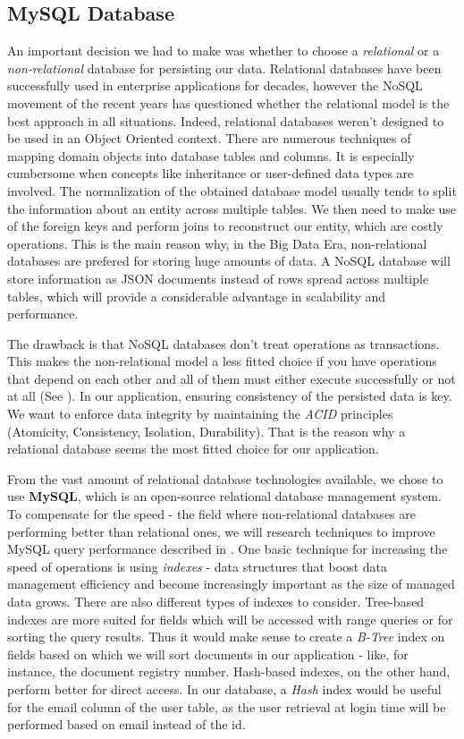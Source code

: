 \subsection{MySQL Database}
\label{section:mysqlDatabase}

An important decision we had to make was whether to choose a \textit{relational} or a \textit{non-relational} database for persisting our data. Relational databases have been successfully used in enterprise applications for decades, however the NoSQL movement of the recent years has questioned whether the relational model is the best approach in all situations. Indeed, relational databases weren't designed to be used in an Object Oriented context. There are numerous techniques of mapping domain objects into database tables and columns. It is especially cumbersome when concepts like inheritance or user-defined data types are involved. The normalization of the obtained database model usually tends to split the information about an entity across multiple tables. We then need to make use of the foreign keys and perform joins to reconstruct our entity, which are costly operations. This is the main reason why, in the Big Data Era, non-relational databases are prefered for storing huge amounts of data. A NoSQL database will store information as JSON documents instead of rows spread across multiple tables, which will provide a considerable advantage in scalability and performance.

The drawback is that NoSQL databases don't treat operations as transactions. This makes the non-relational model a less fitted choice if you have operations that depend on each other and all of them must either execute successfully or not at all (See \cite{conciseGuideToDatabases}). In our application, ensuring consistency of the persisted data is key. We want to enforce data integrity by maintaining the \textit{ACID} principles (Atomicity, Consistency, Isolation, Durability). That is the reason why a relational database seems the most fitted choice for our application.

From the vast amount of relational database technologies available, we chose to use \textbf{MySQL}, which is an open-source relational database management system. To compensate for the speed - the field where non-relational databases are performing better than relational ones, we will research techniques to improve MySQL query performance described in \cite{highPerformanceMySQL}. One basic technique for increasing the speed of operations is using \textit{indexes} - data structures that boost data management efficiency and become increasingly important as the size of managed data grows. There are also different types of indexes to consider. Tree-based indexes are more suited for fields which will be accessed with range queries or for sorting the query results. Thus it would make sense to create a \textit{B-Tree} index on fields based on which we will sort documents in our application - like, for instance, the document registry number. Hash-based indexes, on the other hand, perform better for direct access. In our database, a \textit{Hash} index would be useful for the email column of the user table, as the user retrieval at login time will be performed based on email instead of the id.


